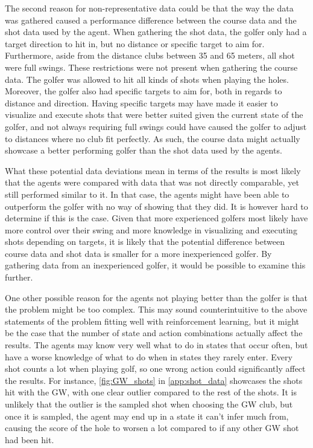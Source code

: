 \documentclass{kththesis}
\begin{document}
The second reason for non-representative data could be that the way the data was gathered caused a performance difference between the course data and the shot data used by the agent. When gathering the shot data, the golfer only had a target direction to hit in, but no distance or specific target to aim for. Furthermore, aside from the distance clubs between 35 and 65 meters, all shot were full swings. These restrictions were not present when gathering the course data. The golfer was allowed to hit all kinds of shots when playing the holes. Moreover, the golfer also had specific targets to aim for, both in regards to distance and direction. Having specific targets may have made it easier to visualize and execute shots that were better suited given the current state of the golfer, and not always requiring full swings could have caused the golfer to adjust to distances where no club fit perfectly. As such, the course data might actually showcase a better performing golfer than the shot data used by the agents.

What these potential data deviations mean in terms of the results is most likely that the agents were compared with data that was not directly comparable, yet still performed similar to it. In that case, the agents might have been able to outperform the golfer with no way of showing that they did. It is however hard to determine if this is the case. Given that more experienced golfers most likely have more control over their swing and more knowledge in visualizing and executing shots depending on targets, it is likely that the potential difference between course data and shot data is smaller for a more inexperienced golfer. By gathering data from an inexperienced golfer, it would be possible to examine this further.

One other possible reason for the agents not playing better than the golfer is that the problem might be too complex. This may sound counterintuitive to the above statements of the problem fitting well with reinforcement learning, but it might be the case that the number of state and action combinations actually affect the results. The agents may know very well what to do in states that occur often, but have a worse knowledge of what to do when in states they rarely enter. Every shot counts a lot when playing golf, so one wrong action could significantly affect the results.  For instance, \autoref{fig:GW_shots} in \autoref{app:shot_data} showcases the shots hit with the GW, with one clear outlier compared to the rest of the shots. It is unlikely that the outlier is the sampled shot when choosing the GW club, but once it is sampled, the agent may end up in a state it can't infer much from, causing the score of the hole to worsen a lot compared to if any other GW shot had been hit.
\end{document}
